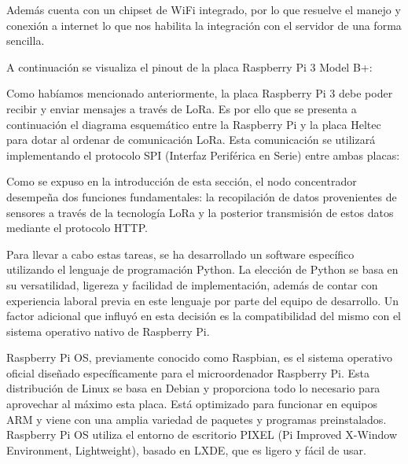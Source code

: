 Además cuenta con un chipset de WiFi integrado, por lo que resuelve el manejo y conexión a internet lo que nos habilita la integración con el servidor de una forma sencilla.

A continuación se visualiza el pinout de la placa Raspberry Pi 3 Model B+:


Como habíamos mencionado anteriormente, la placa Raspberry Pi 3 debe poder recibir y enviar mensajes a través de LoRa. Es por ello que se presenta a continuación el diagrama esquemático entre la Raspberry Pi y la placa Heltec para dotar al ordenar de comunicación LoRa. Esta comunicación se utilizará implementando el protocolo SPI (Interfaz Periférica en Serie) entre ambas placas:


Como se expuso en la introducción de esta sección, el nodo concentrador desempeña dos funciones fundamentales: la recopilación de datos provenientes de sensores a través de la tecnología LoRa y la posterior transmisión de estos datos mediante el protocolo HTTP.

Para llevar a cabo estas tareas, se ha desarrollado un software específico utilizando el lenguaje de programación Python. La elección de Python se basa en su versatilidad, ligereza y facilidad de implementación, además de contar con experiencia laboral previa en este lenguaje por parte del equipo de desarrollo. Un factor adicional que influyó en esta decisión es la compatibilidad del mismo con el sistema operativo nativo de Raspberry Pi.

Raspberry Pi OS, previamente conocido como Raspbian, es el sistema operativo oficial diseñado específicamente para el microordenador Raspberry Pi. Esta distribución de Linux se basa en Debian y proporciona todo lo necesario para aprovechar al máximo esta placa. Está optimizado para funcionar en equipos ARM y viene con una amplia variedad de paquetes y programas preinstalados. Raspberry Pi OS utiliza el entorno de escritorio PIXEL (Pi Improved X-Window Environment, Lightweight), basado en LXDE, que es ligero y fácil de usar.

